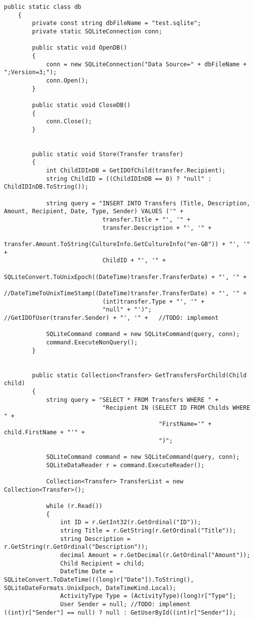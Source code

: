 \begin{lstlisting}[caption={Uddrag af filen "db.cs" fra kildekoden til programmet},label={lst:sqlite}]
    public static class db
    {
        private const string dbFileName = "test.sqlite";
        private static SQLiteConnection conn;

        public static void OpenDB()
        {
            conn = new SQLiteConnection("Data Source=" + dbFileName + ";Version=3;");
            conn.Open();
        }

        public static void CloseDB()
        {
            conn.Close();
        }


        public static void Store(Transfer transfer)
        {
            int ChildIDInDB = GetIDOfChild(transfer.Recipient);
            string ChildID = ((ChildIDInDB == 0) ? "null" : ChildIDInDB.ToString());

            string query = "INSERT INTO Transfers (Title, Description, Amount, Recipient, Date, Type, Sender) VALUES ('" +
                            transfer.Title + "', '" +
                            transfer.Description + "', '" +
                            transfer.Amount.ToString(CultureInfo.GetCultureInfo("en-GB")) + "', '" +
                            ChildID + "', '" +
                            SQLiteConvert.ToUnixEpoch((DateTime)transfer.TransferDate) + "', '" +
                            //DateTimeToUnixTimeStamp((DateTime)transfer.TransferDate) + "', '" +
                            (int)transfer.Type + "', '" +
                            "null" + "')"; //GetIDOfUser(transfer.Sender) + "', '" +   //TODO: implement

            SQLiteCommand command = new SQLiteCommand(query, conn);
            command.ExecuteNonQuery();
        }


        public static Collection<Transfer> GetTransfersForChild(Child child)
        {
            string query = "SELECT * FROM Transfers WHERE " +
                            "Recipient IN (SELECT ID FROM Childs WHERE " +
                                            "FirstName='" + child.FirstName + "'" +
                                            ")";

            SQLiteCommand command = new SQLiteCommand(query, conn);
            SQLiteDataReader r = command.ExecuteReader();

            Collection<Transfer> TransferList = new Collection<Transfer>();

            while (r.Read())
            {
                int ID = r.GetInt32(r.GetOrdinal("ID"));
                string Title = r.GetString(r.GetOrdinal("Title"));
                string Description = r.GetString(r.GetOrdinal("Description"));
                decimal Amount = r.GetDecimal(r.GetOrdinal("Amount"));
                Child Recipient = child;
                DateTime Date = SQLiteConvert.ToDateTime(((long)r["Date"]).ToString(), SQLiteDateFormats.UnixEpoch, DateTimeKind.Local);
                ActivityType Type = (ActivityType)(long)r["Type"];
                User Sender = null; //TODO: implement   ((int)r["Sender"] == null) ? null : GetUserById((int)r["Sender"]);


\end{lstlisting}
